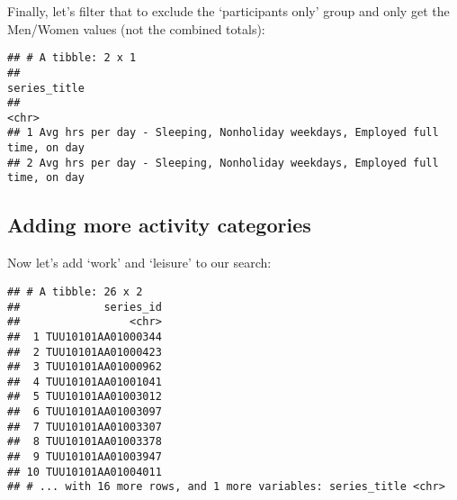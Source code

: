\documentclass[]{book}
\newenvironment{Shaded}{\begin{snugshade}}{\end{snugshade}}
\newcommand{\KeywordTok}[1]{\textcolor[rgb]{0.13,0.29,0.53}{\textbf{{#1}}}}
\newcommand{\DataTypeTok}[1]{\textcolor[rgb]{0.13,0.29,0.53}{{#1}}}
\newcommand{\StringTok}[1]{\textcolor[rgb]{0.31,0.60,0.02}{{#1}}}
\newcommand{\OtherTok}[1]{\textcolor[rgb]{0.56,0.35,0.01}{{#1}}}
\newcommand{\NormalTok}[1]{{#1}}
\theoremstyle{definition}
\theoremstyle{definition}
\theoremstyle{remark}
\begin{document}
Finally, let's filter that to exclude the `participants only' group and
only get the Men/Women values (not the combined totals):

\begin{Shaded}
\end{Shaded}

\begin{verbatim}
## # A tibble: 2 x 1
##                                                                  series_title
##                                                                         <chr>
## 1 Avg hrs per day - Sleeping, Nonholiday weekdays, Employed full time, on day
## 2 Avg hrs per day - Sleeping, Nonholiday weekdays, Employed full time, on day
\end{verbatim}

\subsection{Adding more activity
categories}\label{adding-more-activity-categories}

Now let's add `work' and `leisure' to our search:

\begin{Shaded}
\end{Shaded}

\begin{verbatim}
## # A tibble: 26 x 2
##             series_id
##                 <chr>
##  1 TUU10101AA01000344
##  2 TUU10101AA01000423
##  3 TUU10101AA01000962
##  4 TUU10101AA01001041
##  5 TUU10101AA01003012
##  6 TUU10101AA01003097
##  7 TUU10101AA01003307
##  8 TUU10101AA01003378
##  9 TUU10101AA01003947
## 10 TUU10101AA01004011
## # ... with 16 more rows, and 1 more variables: series_title <chr>
\end{verbatim}
\end{document}
